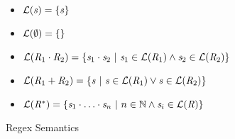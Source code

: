 \begin{figure}

\begin{itemize}
\item $\mathcal{L}(\mathit{s})=\{\mathit{s}\}$
\item $\mathcal{L}(\emptyset)=\{\}$
\item $\mathcal{L}(\mathit{R}_1\cdot\mathit{R}_2) =
\{\mathit{s}_1\cdot\mathit{s}_2 ~|~ \mathit{s}_1\in\mathcal{L}(\mathit{R}_1) \wedge \mathit{s}_2\in\mathcal{L}(\mathit{R}_2)\}$
\item $\mathcal{L}(\mathit{R}_1+\mathit{R}_2) =
\{\mathit{s} ~|~ \mathit{s}\in\mathcal{L}(\mathit{R}_1) \vee \mathit{s}\in\mathcal{L}(\mathit{R}_2)\}$
\item $\mathcal{L}(\mathit{R}^*) =
\{\mathit{s}_1\cdot\ldots\cdot\mathit{s}_n ~|~ n\in\mathbb{N} \wedge \mathit{s}_i\in\mathcal{L}(\mathit{R})\}$

\end{itemize}
\caption{Regex Semantics}
\label{fig:regex-semantics}
\end{figure}
